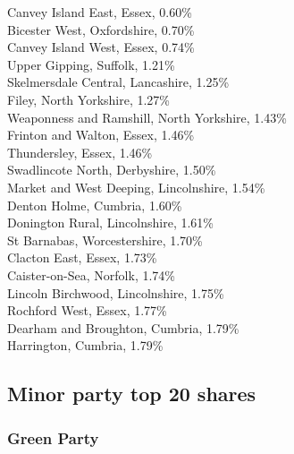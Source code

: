 \documentclass[a4paper,openany,10pt]{book}
\begin{document}
Canvey Island East, Essex, 0.60\%\\
Bicester West, Oxfordshire, 0.70\%\\
Canvey Island West, Essex, 0.74\%\\
Upper Gipping, Suffolk, 1.21\%\\
Skelmersdale Central, Lancashire, 1.25\%\\
Filey, North Yorkshire, 1.27\%\\
Weaponness and Ramshill, North Yorkshire, 1.43\%\\
Frinton and Walton, Essex, 1.46\%\\
Thundersley, Essex, 1.46\%\\
Swadlincote North, Derbyshire, 1.50\%\\
Market and West Deeping, Lincolnshire, 1.54\%\\
Denton Holme, Cumbria, 1.60\%\\
Donington Rural, Lincolnshire, 1.61\%\\
St Barnabas, Worcestershire, 1.70\%\\
Clacton East, Essex, 1.73\%\\
Caister-on-Sea, Norfolk, 1.74\%\\
Lincoln Birchwood, Lincolnshire, 1.75\%\\
Rochford West, Essex, 1.77\%\\
Dearham and Broughton, Cumbria, 1.79\%\\
Harrington, Cumbria, 1.79\%\\

\subsection*{Minor party top 20 shares}

\subsubsection*{Green Party}
\end{document}
